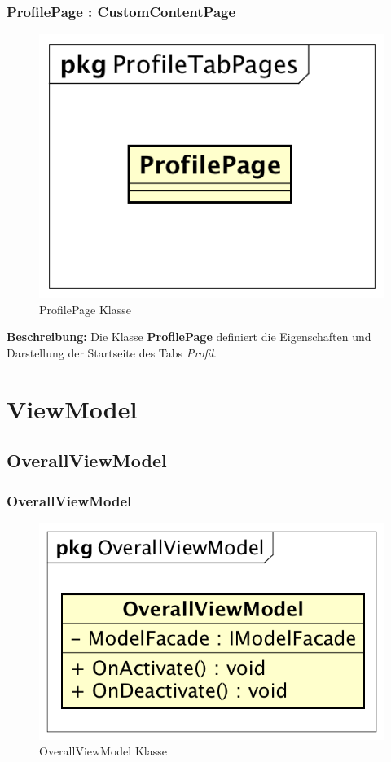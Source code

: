 \documentclass[a4paper]{scrreprt}
\begin{document}
\subsubsection{ProfilePage : CustomContentPage}
\begin{figure}[H]
\centering
\includegraphics[width=0.45\textheight]{graphics/Klassendiagramme/View/ProfilePage.png}
\caption{ProfilePage Klasse}
\end{figure}

\textbf{Beschreibung:} Die Klasse \textbf{ProfilePage} definiert die Eigenschaften und Darstellung der Startseite des Tabs \textit{Profil}.


\section{ViewModel}

\subsection{OverallViewModel}
\subsubsection{OverallViewModel}
\begin{figure}[H]
\centering
\includegraphics[width=0.45\textheight]{graphics/Klassendiagramme/ViewModel/OverallViewModel.png}
\caption{OverallViewModel Klasse}
\end{figure}
\end{document}

